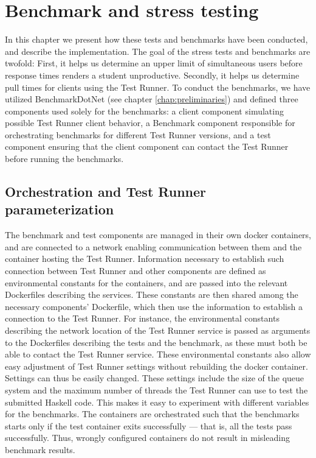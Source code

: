 \chapter{Benchmark and stress testing} \label{chap:Benchmark}
In this chapter we present how these tests and benchmarks have been conducted, and describe the implementation.
The goal of the stress tests and benchmarks are twofold: 
First, it helps us determine an upper limit of simultaneous users before response times renders a student unproductive.
Secondly, it helps us determine pull times for clients using the Test Runner.
To conduct the benchmarks, we have utilized BenchmarkDotNet (see chapter \ref{chap:preliminaries}) and defined three components used solely for the benchmarks:
a client component simulating possible Test Runner client behavior, a Benchmark component responsible for orchestrating benchmarks for different Test Runner versions, and a test component ensuring that the client component can contact the Test Runner before running the benchmarks.

\section{Orchestration and Test Runner parameterization}
The benchmark and test components are managed in their own docker containers, and are connected to a network enabling communication between them and the container hosting the Test Runner. 
Information necessary to establish such connection between Test Runner and other components are defined as environmental constants for the containers, and are passed into the relevant Dockerfiles describing the services.
These constants are then shared among the necessary components' Dockerfile, which then use the information to establish a connection to the Test Runner.
For instance, the environmental constants describing the network location of the Test Runner service is passed as arguments to the Dockerfiles describing the tests and the benchmark, as these must both be able to contact the Test Runner service.
These environmental constants also allow easy adjustment of Test Runner settings without rebuilding the docker container.
Settings can thus be easily changed.
These settings include the size of the queue system and the maximum number of threads the Test Runner can use to test the submitted Haskell code.
This makes it easy to experiment with different variables for the benchmarks.  
The containers are orchestrated such that the benchmarks starts only if the test container exits successfully --- that is, all the tests pass successfully. 
Thus, wrongly configured containers do not result in misleading benchmark results.

